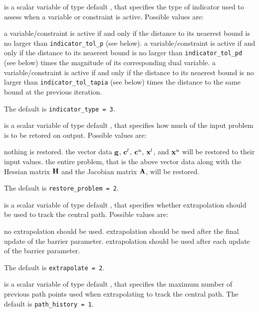 \begin{description}

 is a scalar variable of type default \integer, 
that specifies the type of indicator used to assess when a variable or
constraint is active.
Possible values are:

\begin{description}
 a variable/constraint is active if and only if the distance 
to its neaerest bound is no larger than {\tt indicator\_tol\-\_p} (see below).
 a variable/constraint is active if and only if the distance 
to its neaerest bound is no larger than {\tt indicator\_tol\-\_pd} 
(see below) times the magnitude of its corresponding dual variable.
 a variable/constraint is active if and only if the distance 
to its neaerest bound is no larger than {\tt indicator\_tol\-\_tapia} 
(see below) times the distance to the same bound at the previous iteration.
\end{description}
The default is {\tt indicator\_type = 3}.

 is a scalar variable of type default \integer, that 
specifies how much of the input problem is to be retored on output. 
Possible values are:
\begin{description}
 nothing is restored. 
 the vector data ${\mathbf{g}}$, 
   ${\mathbf{c}}^{l}$, ${\mathbf{c}}^{u}$, ${\mathbf{x}}^{l}$, and ${\mathbf{x}}^{u}$ 
   will be restored to their input values.
 the entire problem, that is the above vector data along with 
the Hessian matrix ${\mathbf{H}}$ and the Jacobian matrix ${\mathbf{A}}$, will be restored.
\end{description}
The default is {\tt restore\_problem = 2}.

 is a scalar variable of type default \integer, that 
specifies whether extrapolation should be used to track the central path. 
Possible values are:
\begin{description}
 no extrapolation should be used.
 extrapolation should be used after the final update of the barrier 
        parameter.
 extrapolation should be used after each update of the barrier 
        parameter.
\end{description}
The default is {\tt extrapolate = 2}.

 is a scalar variable of type default \integer, that 
specifies the maximum number of previous path points used when extrapolating
to track the central path.
The default is {\tt path\_history = 1}.


\end{description}
